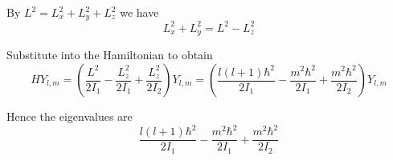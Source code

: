 


\bigskip
By $L^2=L_x^2+L_y^2+L_z^2$ we have
\begin{equation*}
L_x^2+L_y^2=L^2-L_z^2
\end{equation*}

Substitute into the Hamiltonian to obtain
\begin{equation*}
HY_{l,m}=\left(\frac{L^2}{2I_1}-\frac{L_z^2}{2I_1}+\frac{L_z^2}{2I_2}\right)Y_{l,m}
=\left(\frac{l(l+1)\hbar^2}{2I_1}-\frac{m^2\hbar^2}{2I_1}+\frac{m^2\hbar^2}{2I_2}\right)Y_{l,m}
\end{equation*}

Hence the eigenvalues are
\begin{equation*}
\frac{l(l+1)\hbar^2}{2I_1}-\frac{m^2\hbar^2}{2I_1}+\frac{m^2\hbar^2}{2I_2}
\end{equation*}


